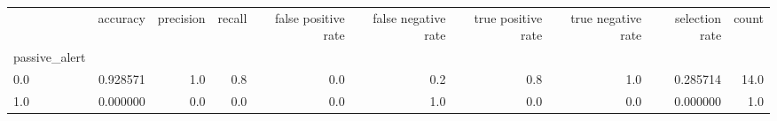 \begin{tabular}{lrrrrrrrrr}
\toprule
{} &  accuracy &  precision &  recall &  false positive rate &  false negative rate &  true positive rate &  true negative rate &  selection rate &  count \\
passive\_alert &           &            &         &                      &                      &                     &                     &                 &        \\
\midrule
0.0           &  0.928571 &        1.0 &     0.8 &                  0.0 &                  0.2 &                 0.8 &                 1.0 &        0.285714 &   14.0 \\
1.0           &  0.000000 &        0.0 &     0.0 &                  0.0 &                  1.0 &                 0.0 &                 0.0 &        0.000000 &    1.0 \\
\bottomrule
\end{tabular}
